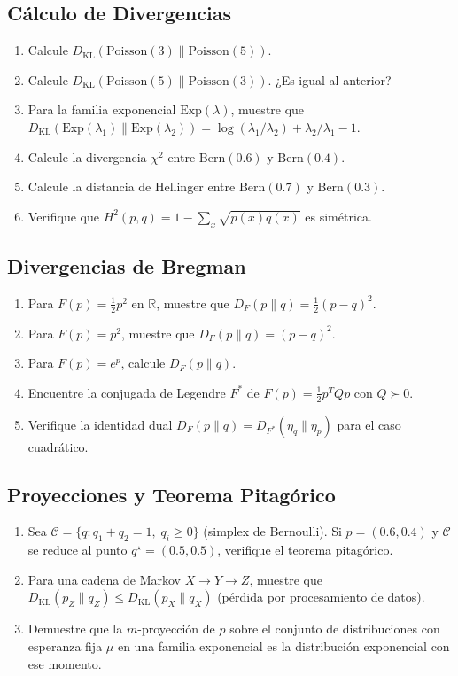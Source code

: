 \subsection*{Cálculo de Divergencias}
\begin{enumerate}[resume]
	\item Calcule $D_{\mathrm{KL}}(\mathrm{Poisson}(3) \| \mathrm{Poisson}(5))$.
	\item Calcule $D_{\mathrm{KL}}(\mathrm{Poisson}(5) \| \mathrm{Poisson}(3))$.  ¿Es igual al anterior?
	\item Para la familia exponencial $\mathrm{Exp}(\lambda)$, muestre que $D_{\mathrm{KL}}(\mathrm{Exp}(\lambda_1) \| \mathrm{Exp}(\lambda_2)) = \log(\lambda_1/\lambda_2) + \lambda_2/\lambda_1 - 1$.
	\item Calcule la divergencia $\chi^2$ entre $\mathrm{Bern}(0.6)$ y $\mathrm{Bern}(0.4)$.
	\item Calcule la distancia de Hellinger entre $\mathrm{Bern}(0.7)$ y $\mathrm{Bern}(0.3)$.
	\item Verifique que $H^2(p,q) = 1 - \sum_x \sqrt{p(x)q(x)}$ es simétrica.
\end{enumerate}

\subsection*{Divergencias de Bregman}
\begin{enumerate}[resume]
	\item Para $F(p) = \frac{1}{2}p^2$ en $\mathbb{R}$, muestre que $D_F(p \| q) = \frac{1}{2}(p-q)^2$.
	\item Para $F(p) = p^2$, muestre que $D_F(p \| q) = (p-q)^2$.
	\item Para $F(p) = e^p$, calcule $D_F(p \| q)$.
	\item Encuentre la conjugada de Legendre $F^*$ de $F(p) = \frac{1}{2}p^TQp$ con $Q \succ 0$.
	\item Verifique la identidad dual $D_F(p \| q) = D_{F^*}(\eta_q \| \eta_p)$ para el caso cuadrático.
\end{enumerate}

\subsection*{Proyecciones y Teorema Pitagórico}
\begin{enumerate}[resume]
	\item Sea $\mathcal{C} = \{q : q_1 + q_2 = 1,\; q_i \ge 0\}$ (simplex de Bernoulli).  Si $p = (0.6, 0.4)$ y $\mathcal{C}$ se reduce al punto $q^\star = (0.5, 0.5)$, verifique el teorema pitagórico.
	\item Para una cadena de Markov $X \to Y \to Z$, muestre que $D_{\mathrm{KL}}(p_Z \| q_Z) \le D_{\mathrm{KL}}(p_X \| q_X)$ (pérdida por procesamiento de datos).
	\item Demuestre que la $m$-proyección de $p$ sobre el conjunto de distribuciones con esperanza fija $\mu$ en una familia exponencial es la distribución exponencial con ese momento.
\end{enumerate}

